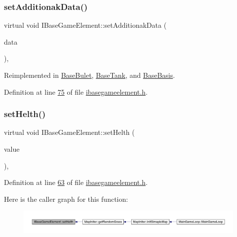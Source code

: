 \subsubsection{\texorpdfstring{set\+Additionak\+Data()}{setAdditionakData()}}
{\footnotesize\ttfamily virtual void I\+Base\+Game\+Element\+::set\+Additionak\+Data (\begin{DoxyParamCaption}\item[{Q\+Byte\+Array $\ast$}]{data }\end{DoxyParamCaption})\hspace{0.3cm}{\ttfamily [inline]}, {\ttfamily [virtual]}}



Reimplemented in \hyperlink{a00153_ae97774994602a89562688f97339b9eb3}{Base\+Bulet}, \hyperlink{a00157_a7e61943b1d601b7ff3206857f5198e66}{Base\+Tank}, and \hyperlink{a00149_a17b5facef5ea0c9bb9c558a90831d6f9}{Base\+Basis}.



Definition at line \hyperlink{a00047_source_l00075}{75} of file \hyperlink{a00047_source}{ibasegameelement.\+h}.

\mbox{\label{a00137_a2f95e7a61b5db7f2fbbfd32ff786f58c}} 
\subsubsection{\texorpdfstring{set\+Helth()}{setHelth()}}
{\footnotesize\ttfamily virtual void I\+Base\+Game\+Element\+::set\+Helth (\begin{DoxyParamCaption}\item[{\hyperlink{a00161}{Infinity\+Double} $\ast$}]{value }\end{DoxyParamCaption})\hspace{0.3cm}{\ttfamily [inline]}, {\ttfamily [virtual]}}



Definition at line \hyperlink{a00047_source_l00063}{63} of file \hyperlink{a00047_source}{ibasegameelement.\+h}.

Here is the caller graph for this function\+:
\nopagebreak
\begin{figure}[H]
\begin{center}
\leavevmode
\includegraphics[width=350pt]{d2/df5/a00137_a2f95e7a61b5db7f2fbbfd32ff786f58c_icgraph}
\end{center}
\end{figure}
\mbox{\label{a00137_a874f246d3249a989750e3db85ea4bfcd}} 
